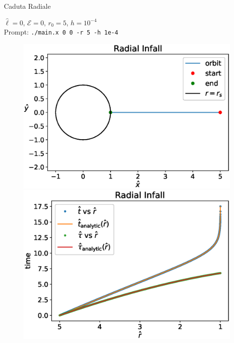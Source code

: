 \begin{frame}{Caduta Radiale}

    $\hat \ell = 0$, $\mathcal E = 0$, $r_0 = 5$, $h = 10^{-4}$ \\
    Prompt: \texttt{./main.x 0 0 -r 5 -h 1e-4}

    \begin{figure}[h]
        \begin{minipage}{0.48\textwidth}
            \centering
            \includegraphics[width=\textwidth]{Figures/ch2/radial_infall.eps}
        \end{minipage}
        \hspace{0.015 \textwidth}
        \begin{minipage}{0.48\textwidth}
            \centering
            \includegraphics[width=\textwidth]{Figures/ch2/t_vs_tau.eps}
        \end{minipage}
    \end{figure}

\end{frame}


